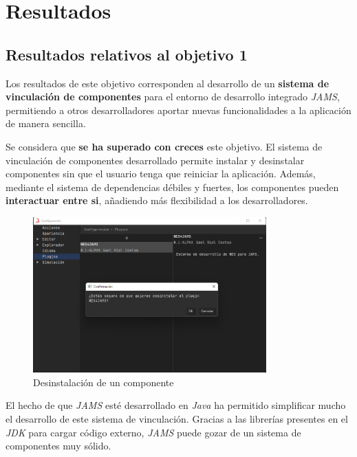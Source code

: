 \chapter{Resultados}\label{ch:resultados}


\section{Resultados relativos al objetivo 1}\label{sec:resultados-relativos-al-objetivo-1}

Los resultados de este objetivo corresponden al desarrollo
de un \textbf{sistema de vinculación de componentes} para el
entorno de desarrollo integrado \textit{JAMS},
permitiendo a otros desarrolladores aportar nuevas funcionalidades
a la aplicación de manera sencilla.

Se considera que \textbf{se ha superado con creces} este objetivo.
El sistema de vinculación de componentes desarrollado permite
instalar y desinstalar componentes sin que el usuario tenga
que reiniciar la aplicación.
Además, mediante el sistema de dependencias débiles y fuertes,
los componentes pueden \textbf{interactuar entre si}, añadiendo
más flexibilidad a los desarrolladores.

\begin{figure}[h]
    \centering
    \includegraphics[width=0.8\textwidth]{images/results/jams-uninstall}
    \caption{Desinstalación de un componente}
    \label{fig:jams-uninstall}
\end{figure}

El hecho de que \textit{JAMS} esté desarrollado en \textit{Java}
ha permitido simplificar mucho el desarrollo de este sistema
de vinculación.
Gracias a las librerías presentes en el \textit{JDK} para cargar
código externo, \textit{JAMS} puede gozar de un sistema de componentes
muy sólido.


